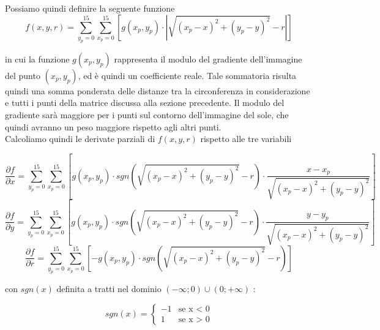 \documentclass[12pt]{article}
\begin{document}
        \noindent
        Possiamo quindi definire la seguente funzione
        \begin{equation}
            f(x, y, r) = \sum_{y_p = 0}^{15} \sum_{x_p = 0}^{15} \left[ g(x_p, y_p) \cdot \left| \sqrt{(x_p-x)^2 + (y_p-y)^2} -r \right| \right] 
        \end{equation}
        
        \noindent
        in cui la funzione $ g(x_p, y_p) $ rappresenta il modulo del gradiente dell'immagine del punto $ (x_p, y_p) $, ed è quindi un coefficiente reale. Tale sommatoria risulta quindi una somma ponderata delle distanze tra la circonferenza in considerazione e tutti i punti della matrice discussa alla sezione precedente. Il modulo del gradiente sarà maggiore per i punti sul contorno dell'immagine del sole, che quindi avranno un peso maggiore rispetto agli altri punti.\\
        Calcoliamo quindi le derivate parziali di $ f(x, y, r) $ rispetto alle tre variabili
        
        \begin {equation}
            \frac{\partial f}{\partial x} = \sum_{y_p = 0}^{15} \sum_{x_p = 0}^{15} \left[ g(x_p, y_p) \cdot sgn \left( \sqrt{(x_p-x)^2 + (y_p-y)^2} - r \right) \cdot \frac{x - x_p}{\sqrt{(x_p - x)^2 + (y_p - y)^2}} \right] 
        \end {equation}
        \begin {equation}
            \frac{\partial f}{\partial y} = \sum_{y_p = 0}^{15} \sum_{x_p = 0}^{15} \left[ g(x_p, y_p) \cdot sgn \left( \sqrt{(x_p-x)^2 + (y_p-y)^2} - r \right) \cdot \frac{y - y_p}{\sqrt{(x_p - x)^2 + (y_p - y)^2}} \right] 
        \end {equation}
        \begin {equation}
            \frac{\partial f}{\partial r} = \sum_{y_p = 0}^{15} \sum_{x_p = 0}^{15} \left[ - g(x_p, y_p) \cdot sgn \left( \sqrt{(x_p-x)^2 + (y_p-y)^2} - r \right) \right] 
        \end {equation}
        
        \noindent
        con $ sgn(x)$ definita a tratti nel dominio $(- \infty ; 0) \cup (0; +\infty) $ :
        
        \begin {equation}
            sgn(x) = 
                \begin{cases}
                  -1 & \text{se x < 0} \\
                  1 & \text{se x > 0}
                \end{cases}
        \end {equation}
        
\end{document}
